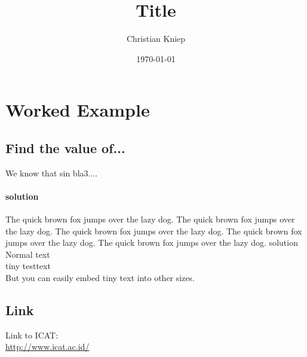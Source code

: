 \documentclass[11pt]{article}
\author{Christian Kniep}
\title{Title}
\date{\today}
\begin{document}
\maketitle
\section{Worked Example}
\subsection{Find the value of...}
We know that sin bla3....\\
\paragraph{solution} The quick brown fox jumps over the lazy dog. The quick brown fox jumps over the lazy dog. The quick brown fox jumps over the lazy dog.  The quick brown fox jumps over the lazy dog.  The quick brown fox jumps over the lazy dog.   
solution\\
Normal text \\ %
\tiny           %
tiny testtext \\
\normalsize     %
But you can easily embed {\tiny tiny text} into other sizes.
\subsection{Link}
Link to ICAT: \\
\url{http://www.icat.ac.id/}
\end{document}
